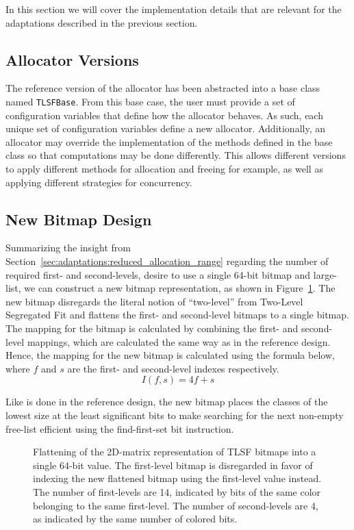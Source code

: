 
In this section we will cover the implementation details that are relevant for the adaptations described in the previous section.

\subsection{Allocator Versions}

The reference version of the allocator has been abstracted into a base class named \texttt{TLSFBase}. From this base case, the user must provide a set of configuration variables that define how the allocator behaves. As such, each unique set of configuration variables define a new allocator. Additionally, an allocator may override the implementation of the methods defined in the base class so that computations may be done differently. This allows different versions to apply different methods for allocation and freeing for example, as well as applying different strategies for concurrency.

\subsection{New Bitmap Design}

Summarizing the insight from Section~\ref{sec:adaptations:reduced_allocation_range} regarding the number of required first- and second-levels, desire to use a single 64-bit bitmap and large-list, we can construct a new bitmap representation, as shown in Figure~\ref{fig:bitmap_flattening}. The new bitmap disregards the literal notion of ``two-level'' from Two-Level Segregated Fit and flattens the first- and second-level bitmaps to a single bitmap. The mapping for the bitmap is calculated by combining the first- and second-level mappings, which are calculated the same way as in the reference design. Hence, the mapping for the new bitmap is calculated using the formula below, where $f$ and $s$ are the first- and second-level indexes respectively.
\[
    I(f, s) = 4f + s
\]

Like is done in the reference design, the new bitmap places the classes of the lowest size at the least significant bits to make searching for the next non-empty free-list efficient using the find-first-set bit instruction.

\begin{figure}[H]
    \centering
    
    \vspace*{4mm}
    \caption{Flattening of the 2D-matrix representation of TLSF bitmaps into a single 64-bit value. The first-level bitmap is disregarded in favor of indexing the new flattened bitmap using the first-level value instead. The number of first-levels are 14, indicated by bits of the same color belonging to the same first-level. The number of second-levels are 4, as indicated by the same number of colored bits.}
    \label{fig:bitmap_flattening}
\end{figure}

